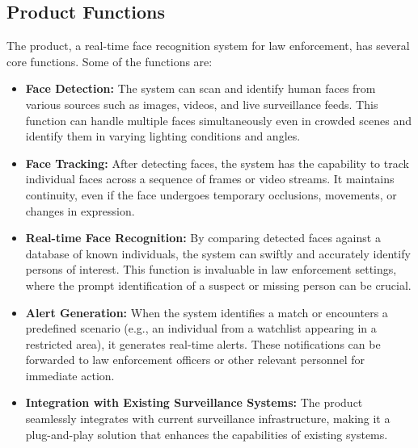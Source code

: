     \subsection{Product Functions}
        The product, a real-time face recognition system for law enforcement, has several core functions. Some of the functions are:
        \begin{itemize}
            \item \textbf{Face Detection:} The system can scan and identify human faces from various sources such as images, videos, and live surveillance feeds. This function can handle multiple faces simultaneously even in crowded scenes and identify them in varying lighting conditions and angles.
            \item \textbf{Face Tracking:} After detecting faces, the system has the capability to track individual faces across a sequence of frames or video streams. It maintains continuity, even if the face undergoes temporary occlusions, movements, or changes in expression.
            \item \textbf{Real-time Face Recognition:} By comparing detected faces against a database of known individuals, the system can swiftly and accurately identify persons of interest. This function is invaluable in law enforcement settings, where the prompt identification of a suspect or missing person can be crucial.
            \item \textbf{Alert Generation:} When the system identifies a match or encounters a predefined scenario (e.g., an individual from a watchlist appearing in a restricted area), it generates real-time alerts. These notifications can be forwarded to law enforcement officers or other relevant personnel for immediate action.
            \item \textbf{Integration with Existing Surveillance Systems:} The product seamlessly integrates with current surveillance infrastructure, making it a plug-and-play solution that enhances the capabilities of existing systems.
        \end{itemize}
    
